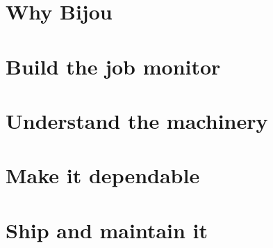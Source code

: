 \part{Why Bijou}\label{part-why}
%
%
%
\part{Build the job monitor}\label{part-workshops}
%
%
%
%
%
\part{Understand the machinery}\label{part-machinery}
%
%
%
%
\part{Make it dependable}\label{part-dependable}
%
%
%
%
\part{Ship and maintain it}\label{part-maintain}
%
%
%
